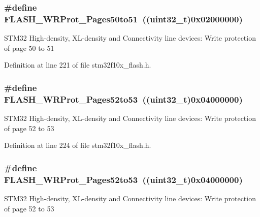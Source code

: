 \subsubsection[{\texorpdfstring{F\+L\+A\+S\+H\+\_\+\+W\+R\+Prot\+\_\+\+Pages50to51}{FLASH_WRProt_Pages50to51}}]{\setlength{\rightskip}{0pt plus 5cm}\#define F\+L\+A\+S\+H\+\_\+\+W\+R\+Prot\+\_\+\+Pages50to51~(({\bf uint32\+\_\+t})0x02000000)}\hypertarget{group___option___bytes___write___protection_ga053321e47944270a5fdcf0d58e16ec13}{}\label{group___option___bytes___write___protection_ga053321e47944270a5fdcf0d58e16ec13}
S\+T\+M32 High-\/density, X\+L-\/density and Connectivity line devices\+: Write protection of page 50 to 51 

Definition at line 221 of file stm32f10x\+\_\+flash.\+h.

\subsubsection[{\texorpdfstring{F\+L\+A\+S\+H\+\_\+\+W\+R\+Prot\+\_\+\+Pages52to53}{FLASH_WRProt_Pages52to53}}]{\setlength{\rightskip}{0pt plus 5cm}\#define F\+L\+A\+S\+H\+\_\+\+W\+R\+Prot\+\_\+\+Pages52to53~(({\bf uint32\+\_\+t})0x04000000)}\hypertarget{group___option___bytes___write___protection_gae4eefefb23e8913e4aa558a6a2599fa5}{}\label{group___option___bytes___write___protection_gae4eefefb23e8913e4aa558a6a2599fa5}
S\+T\+M32 High-\/density, X\+L-\/density and Connectivity line devices\+: Write protection of page 52 to 53 

Definition at line 224 of file stm32f10x\+\_\+flash.\+h.

\subsubsection[{\texorpdfstring{F\+L\+A\+S\+H\+\_\+\+W\+R\+Prot\+\_\+\+Pages52to53}{FLASH_WRProt_Pages52to53}}]{\setlength{\rightskip}{0pt plus 5cm}\#define F\+L\+A\+S\+H\+\_\+\+W\+R\+Prot\+\_\+\+Pages52to53~(({\bf uint32\+\_\+t})0x04000000)}\hypertarget{group___option___bytes___write___protection_gae4eefefb23e8913e4aa558a6a2599fa5}{}\label{group___option___bytes___write___protection_gae4eefefb23e8913e4aa558a6a2599fa5}
S\+T\+M32 High-\/density, X\+L-\/density and Connectivity line devices\+: Write protection of page 52 to 53 

